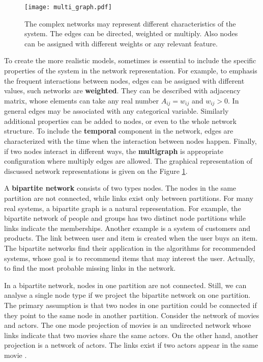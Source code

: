 \begin{figure}[H]
	\centering
	\texttt{[image: multi\_graph.pdf]} 
	\caption{The complex networks may represent different characteristics of the system. The edges can be directed, weighted or multiply. Also nodes can be assigned with different weights or any relevant feature.}
	\label{fig:multigraph}
\end{figure}

To create the more realistic models, sometimes is essential to include the specific properties of the system in the network representation. For example, to emphasis the frequent interactions between nodes, edges can be assigned with different values, such networks are \textbf{weighted}. They can be described with adjacency matrix, whose elements can take any real number $A_{ij}=w_{ij}$ and $w_{ij}>0$. In general edges may be associated with any categorical variable. Similarly additional properties can be added to nodes, or even to the whole network structure. To include the \textbf{temporal} component in the network, edges are characterized with the time when the interaction between nodes happen. Finally, if two nodes interact in different ways, the \textbf{multigraph} is appropriate configuration where multiply edges are allowed. The graphical representation of discussed network representations is given on the Figure \ref{fig:multigraph}.

A \textbf{bipartite network} consists of two types nodes. The nodes in the same partition are not connected, while links exist only between partitions. For many real systems, a bipartite graph is a natural representation\cite{barabasi2016network, latora2017complex}. For example, the bipartite network of people and groups has two distinct node partitions while links indicate the memberships. Another example is a system of customers and products. The link between user and item is created when the user buys an item. The bipartite networks find their application in the algorithms for recommended systems, whose goal is to recommend items that may interest the user. Actually, to find the most probable missing links in the network. 

In a bipartite network, nodes in one partition are not connected. Still, we can analyse a single node type if we project the bipartite network on one partition. The primary assumption is that two nodes in one partition could be connected if they point to the same node in another partition. Consider the network of movies and actors. The one mode projection of movies is an undirected network whose links indicate that two movies share the same actors. On the other hand, another projection is a network of actors. The links exist if two actors appear in the same movie \cite{newman2010, barabasi2016network}.

